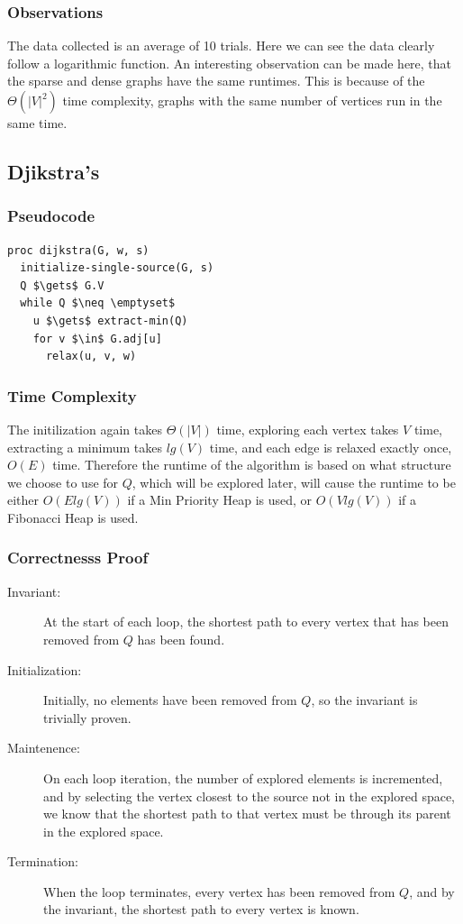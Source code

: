 \documentclass[a4paper,12pt]{article}
\begin{document}
\subsubsection{Observations}
The data collected is an average of 10 trials. Here we can see the data clearly follow a logarithmic function. An interesting observation can be made here, that the sparse and dense graphs have the same runtimes. This is because of the $\Theta(|V|^2)$ time complexity, graphs with the same number of vertices run in the same time.
\subsection{Djikstra's}
\subsubsection{Pseudocode}
\begin{lstlisting}[mathescape=true]
proc dijkstra(G, w, s)
  initialize-single-source(G, s)
  Q $\gets$ G.V
  while Q $\neq \emptyset$
    u $\gets$ extract-min(Q)
    for v $\in$ G.adj[u]
      relax(u, v, w)
\end{lstlisting}
\subsubsection{Time Complexity}
The initilization again takes $\Theta(|V|)$ time, exploring each vertex takes $V$ time, extracting a minimum takes $lg(V)$ time, and each edge is relaxed exactly once, $O(E)$ time. Therefore the runtime of the algorithm is based on what structure we choose to use for $Q$, which will be explored later, will cause the runtime to be either $O(Elg(V))$ if a Min Priority Heap is used, or $O(Vlg(V))$ if a Fibonacci Heap is used.
\subsubsection{Correctnesss Proof}
\begin{description}
\item [Invariant: ] At the start of each loop, the shortest path to every vertex that has been removed from $Q$ has been found.
\item [Initialization: ] Initially, no elements have been removed from $Q$, so the invariant is trivially proven.
\item [Maintenence: ] On each loop iteration, the number of explored elements is incremented, and by selecting the vertex closest to the source not in the explored space, we know that the shortest path to that vertex must be through its parent in the explored space.
\item [Termination: ] When the loop terminates, every vertex has been removed from $Q$, and by the invariant, the shortest path to every vertex is known.
\end{description}
\end{document}
